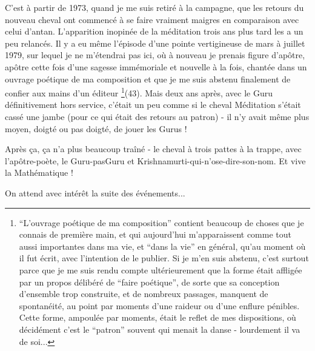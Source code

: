 C'est à partir de 1973, quand je me suis retiré à la campagne, que les retours du nouveau cheval ont commencé à se faire vraiment maigres en comparaison avec celui d'antan. L'apparition inopinée de la méditation trois ans plus tard les a un peu relancés. Il y a eu même l'épisode d'une pointe vertigineuse de mars à juillet 1979, sur lequel je ne m'étendrai pas ici, où à nouveau je prenais figure d'apôtre, apôtre cette fois d'une sagesse immémoriale et nouvelle à la fois, chantée dans un ouvrage poétique de ma composition et que je me suis abstenu finalement de confier aux mains d'un éditeur \footnote{``L'ouvrage poétique de ma composition'' contient beaucoup de choses que je connais de première main, et qui aujourd'hui m'apparaissent comme tout aussi importantes dans ma vie, et ``dans la vie'' en général, qu'au moment où il fut écrit, avec l'intention de le publier. Si je m'en suis abstenu, c'est surtout parce que je me suis rendu compte ultérieurement que la forme était affligée par un propos délibéré de ``faire poétique'', de sorte que sa conception d'ensemble trop construite, et de nombreux passages, manquent de spontanéité, au point par moments d'une raideur ou d'une enflure pénibles. Cette forme, ampoulée par moments, était le reflet de mes dispositions, où décidément c'est le ``patron'' souvent qui menait la danse - lourdement il va de soi...}(43). Mais deux ans après, avec le Guru définitivement hors service, c'était un peu comme si le cheval Méditation s'était cassé une jambe (pour ce qui était des retours au patron) - il n'y avait même plus moyen, doigté ou pas doigté, de jouer les Gurus !

Après ça, ça n'a plus beaucoup traîné - le cheval à trois pattes à la trappe, avec l'apôtre-poète, le Guru-pasGuru et Krishnamurti-qui-n'ose-dire-son-nom. Et vive la Mathématique !

On attend avec intérêt la suite des événements...